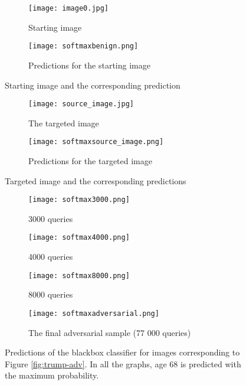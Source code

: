 \begin{figure}
\begin{subfigure}{.5\textwidth}
  \centering
  \texttt{[image: image0.jpg]}
  \caption{Starting image}
\end{subfigure}
\begin{subfigure}{.5\textwidth}
  \centering
  \texttt{[image: softmaxbenign.png]}
  \caption{Predictions for the starting image}
\end{subfigure}
\caption{Starting image and the corresponding prediction}
\label{fig:starting-image-softmax}
\end{figure}

\begin{figure}
\begin{subfigure}{.5\textwidth}
  \centering
  \texttt{[image: source\_image.jpg]}
  \caption{The targeted image}
\end{subfigure}
\begin{subfigure}{.5\textwidth}
  \centering
  \texttt{[image: softmaxsource\_image.png]}
  \caption{Predictions for the targeted image}
\end{subfigure}

\caption{Targeted image and the corresponding predictions}
\label{fig:targeted-image-softmax}
\end{figure}

\begin{figure}

\begin{subfigure}{.5\textwidth}
  \centering%
  \texttt{[image: softmax3000.png]}
  \caption{3000 queries}
\end{subfigure}
\begin{subfigure}{.5\textwidth}
  \centering%
  \texttt{[image: softmax4000.png]}
  \caption{4000 queries}
\end{subfigure}


\begin{subfigure}{.5\textwidth}
  \centering%
  \texttt{[image: softmax8000.png]}
  \caption{8000 queries}
\end{subfigure}
\begin{subfigure}{.5\textwidth}
  \centering%
  \texttt{[image: softmaxadversarial.png]}
  \caption{The final adversarial sample (77 000 queries)}
\end{subfigure}

\caption{Predictions of the blackbox classifier for images corresponding to Figure \ref{fig:trump-adv}. In all the graphs, age 68 is predicted with the maximum probability.}
\label{fig:trump-softmax}
\end{figure}


